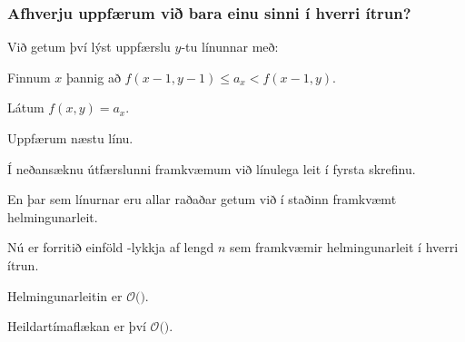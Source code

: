 {
    \frametitle{Afhverju uppfærum við bara einu sinni í hverri ítrun?}
    {
        \item<1-> Við getum því lýst uppfærslu $y$-tu línunnar með:
        {
            \item<2-> Finnum $x$ þannig að $f(x - 1, y - 1) \leq a_x < f(x - 1, y)$.
            \item<3-> Látum $f(x, y) = a_x$.
            \item<4-> Uppfærum næstu línu.
        }
        \item<5-> Í neðansæknu útfærslunni framkvæmum við línulega leit í fyrsta skrefinu.
        \item<6-> En þar sem línurnar eru allar raðaðar getum við í staðinn framkvæmt helmingunarleit.
    }
}

{
}

{
    {
        \item<1-> Nú er forritið einföld -lykkja af lengd $n$ sem framkvæmir helmingunarleit í hverri ítrun.
        \item<2-> Helmingunarleitin er $\mathcal{O}($$)$.
        \item<4-> Heildartímaflækan er því $\mathcal{O}($$)$.
    }
}

{
}


